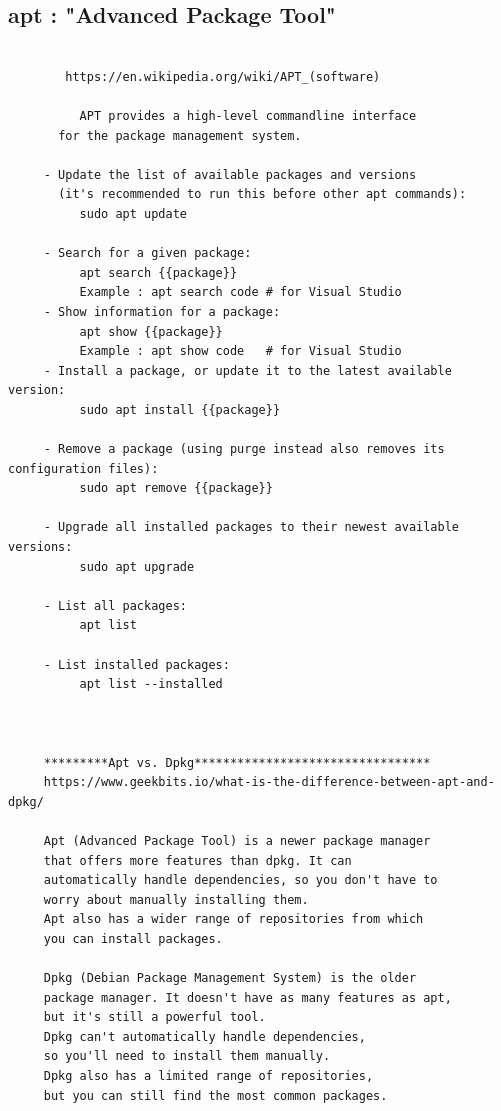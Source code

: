\documentclass[a4paper,12pt]{article}
\begin{document}
\subsection{apt   : "Advanced Package Tool"}
\begin{verbatim}
        
        https://en.wikipedia.org/wiki/APT_(software)       
       
          APT provides a high-level commandline interface
       for the package management system. 
     
     - Update the list of available packages and versions 
       (it's recommended to run this before other apt commands):
          sudo apt update

     - Search for a given package:
          apt search {{package}}
          Example : apt search code # for Visual Studio
     - Show information for a package:
          apt show {{package}}
          Example : apt show code   # for Visual Studio
     - Install a package, or update it to the latest available version:
          sudo apt install {{package}}

     - Remove a package (using purge instead also removes its configuration files):
          sudo apt remove {{package}}

     - Upgrade all installed packages to their newest available versions:
          sudo apt upgrade

     - List all packages:
          apt list

     - List installed packages:
          apt list --installed



     *********Apt vs. Dpkg*********************************
     https://www.geekbits.io/what-is-the-difference-between-apt-and-dpkg/
     
     Apt (Advanced Package Tool) is a newer package manager
     that offers more features than dpkg. It can 
     automatically handle dependencies, so you don't have to
     worry about manually installing them. 
     Apt also has a wider range of repositories from which
     you can install packages.

     Dpkg (Debian Package Management System) is the older
     package manager. It doesn't have as many features as apt,
     but it's still a powerful tool. 
     Dpkg can't automatically handle dependencies, 
     so you'll need to install them manually. 
     Dpkg also has a limited range of repositories, 
     but you can still find the most common packages.



\end{verbatim}
\end{document}
